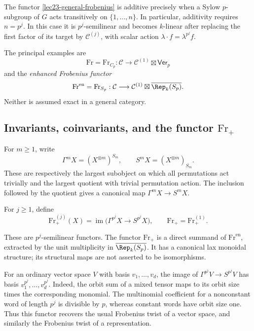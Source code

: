 The functor \eqref{lec23-general-frobenius} is additive precisely when a
Sylow $p$-subgroup of $G$ acts transitively on $\{1,\ldots,n\}$.
In particular, additivity requires $n=p^j$. In this case it is
$p^j$-semilinear and becomes $k$-linear after replacing the first factor
of its target by $\mathcal C^{(j)}$, with scalar action
$\lambda\cdot f=\lambda^{p^j}f$.

The principal examples are
\[
 \mathrm{Fr}=\mathrm{Fr}_{C_p}:
 \mathcal C\longrightarrow\mathcal C^{(1)}\boxtimes\mathsf{Ver}_p
\]
and the \emph{enhanced Frobenius functor}
\[
 \mathrm{Fr}^{\mathrm{en}}=\mathrm{Fr}_{S_p}:
 \mathcal C\longrightarrow
 \mathcal C^{(1)}\boxtimes\overline{\Rep_k(S_p)}.
\]
Neither is assumed exact in a general category.

\subsection{Invariants, coinvariants, and the functor $\mathrm{Fr}_+$}
For $m\geq1$, write
\[
 \Gamma^mX=(X^{\otimes m})^{S_m},\qquad
 S^mX=(X^{\otimes m})_{S_m}.
\]
These are respectively the largest subobject on which all permutations
act trivially and the largest quotient with trivial permutation action.
The inclusion followed by the quotient gives a canonical map
$\Gamma^mX\to S^mX$.

\begin{definition}
For $j\geq1$, define
\[
 \mathrm{Fr}^{(j)}_+(X)=
 \operatorname{im}\bigl(\Gamma^{p^j}X\longrightarrow S^{p^j}X\bigr),
 \qquad \mathrm{Fr}_+=\mathrm{Fr}^{(1)}_+.
\]
\end{definition}
These are $p^j$-semilinear functors. The functor $\mathrm{Fr}_+$ is a
direct summand of $\mathrm{Fr}^{\mathrm{en}}$, extracted by the unit
multiplicity in $\overline{\Rep_k(S_p)}$. It has a canonical lax monoidal
structure; its structural maps are not asserted to be isomorphisms.

\begin{example}
For an ordinary vector space $V$ with basis $v_1,\ldots,v_d$, the image of
$\Gamma^{p^j}V\to S^{p^j}V$ has basis $v_1^{p^j},\ldots,v_d^{p^j}$.
Indeed, the orbit sum of a mixed tensor maps to its orbit size times the
corresponding monomial. The multinomial coefficient for a nonconstant
word of length $p^j$ is divisible by $p$, whereas constant words have
orbit size one. Thus this functor recovers the usual Frobenius twist of
a vector space, and similarly the Frobenius twist of a representation.
\end{example}

